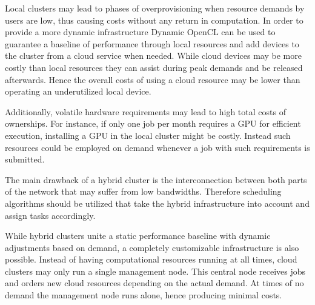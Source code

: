 \begin{description}[style=nextline]
	\item[Hybrid Cloud Provider] 
	Local clusters may lead to phases of overprovisioning when resource demands by users are low, thus causing costs without any return in computation. In order to provide a more dynamic infrastructure Dynamic OpenCL can be used to guarantee a baseline of performance through local resources and add devices to the cluster from a cloud service when needed. While cloud devices may be more costly than local resources they can assist during peak demands and be released afterwards. Hence the overall costs of using a cloud resource may be lower than operating an underutilized local device.
	
	Additionally, volatile hardware requirements may lead to high total costs of ownerships. For instance, if only one job per month requires a GPU for efficient execution, installing a GPU in the local cluster might be costly. Instead such resources could be employed on demand whenever a job with such requirements is submitted.
	
	The main drawback of a hybrid cluster is the interconnection between both parts of the network that may suffer from low bandwidths. Therefore scheduling algorithms should be utilized that take the hybrid infrastructure into account and assign tasks accordingly.
	
	\item[Cloud Cluster Provider]
	While hybrid clusters unite a static performance baseline with dynamic adjustments based on demand, a completely customizable infrastructure is also possible. Instead of having computational resources running at all times, cloud clusters may only run a single management node. This central node receives jobs and orders new cloud resources depending on the actual demand. At times of no demand the management node runs alone, hence producing minimal costs.
	
	
\end{description}


